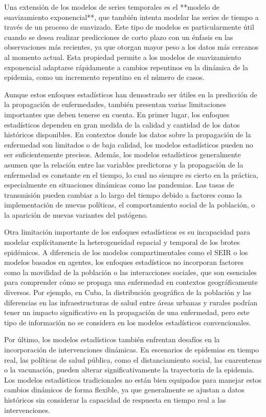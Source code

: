 Una extensión de los modelos de series temporales es el **modelo de suavizamiento exponencial**, que también intenta modelar las series de tiempo a través de un proceso de suavizado. Este tipo de modelos es particularmente útil cuando se desea realizar predicciones de corto plazo con un énfasis en las observaciones más recientes, ya que otorgan mayor peso a los datos más cercanos al momento actual. Esta propiedad permite a los modelos de suavizamiento exponencial adaptarse rápidamente a cambios repentinos en la dinámica de la epidemia, como un incremento repentino en el número de casos.

Aunque estos enfoques estadísticos han demostrado ser útiles en la predicción de la propagación de enfermedades, también presentan varias limitaciones importantes que deben tenerse en cuenta. En primer lugar, los enfoques estadísticos dependen en gran medida de la calidad y cantidad de los datos históricos disponibles. En contextos donde los datos sobre la propagación de la enfermedad son limitados o de baja calidad, los modelos estadísticos pueden no ser suficientemente precisos. Además, los modelos estadísticos generalmente asumen que la relación entre las variables predictoras y la propagación de la enfermedad es constante en el tiempo, lo cual no siempre es cierto en la práctica, especialmente en situaciones dinámicas como las pandemias. Las tasas de transmisión pueden cambiar a lo largo del tiempo debido a factores como la implementación de nuevas políticas, el comportamiento social de la población, o la aparición de nuevas variantes del patógeno.

Otra limitación importante de los enfoques estadísticos es su incapacidad para modelar explícitamente la heterogeneidad espacial y temporal de los brotes epidémicos. A diferencia de los modelos compartimentales como el SEIR o los modelos basados en agentes, los enfoques estadísticos no incorporan factores como la movilidad de la población o las interacciones sociales, que son esenciales para comprender cómo se propaga una enfermedad en contextos geográficamente diversos. Por ejemplo, en Cuba, la distribución geográfica de la población y las diferencias en las infraestructuras de salud entre áreas urbanas y rurales podrían tener un impacto significativo en la propagación de una enfermedad, pero este tipo de información no se considera en los modelos estadísticos convencionales.

Por último, los modelos estadísticos también enfrentan desafíos en la incorporación de intervenciones dinámicas. En escenarios de epidemias en tiempo real, las políticas de salud pública, como el distanciamiento social, las cuarentenas o la vacunación, pueden alterar significativamente la trayectoria de la epidemia. Los modelos estadísticos tradicionales no están bien equipados para manejar estos cambios dinámicos de forma flexible, ya que generalmente se ajustan a datos históricos sin considerar la capacidad de respuesta en tiempo real a las intervenciones.

